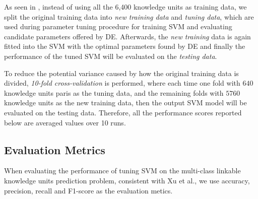 As seen in , instead of using all the 6,400 knowledge units as training data, 
we split the original training data into {\it new training data} and {\it tuning data}, which are
used during parameter tuning procedure for training SVM and evaluating candidate
parameters offered by DE. Afterwards, the {\it new training} data is again fitted into the SVM
with the optimal parameters found by DE and finally  the performance of the tuned
SVM will be evaluated on the  {\it testing data}.

To reduce the potential variance caused
by how the original training data is divided, {\it 10-fold cross-validation} is performed, where
each time one fold with $640$ knowledge units paris as the tuning data, and the remaining folds with $5760$
knowledge units as  the new training data, then the output SVM model will be evaluated on the testing data. Therefore,
all the performance scores reported below are averaged values over 10 runs.



\subsection{Evaluation Metrics}
When evaluating the performance of tuning SVM on the
multi-class linkable knowledge units prediction problem,
consistent with Xu et al.\cite{xu2016predicting}, we use accuracy, precision, recall and F1-score
as the evaluation metics.

\begin{table}[htp]
\caption {Confusion Matrix.}
\scriptsize
{}

\label{tab:confusion}
\end{table}

